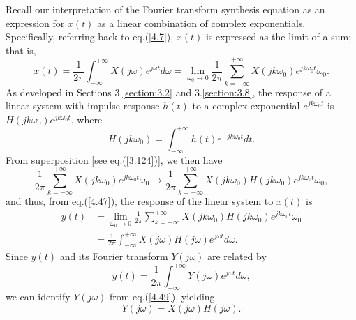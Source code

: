 \documentclass[a4paper,twoside]{book}
\begin{document}
Recall our interpretation of the Fourier transform synthesis equation as an expression for $x(t)$ as a linear combination of complex exponentials. Specifically, referring back to eq.\;(\ref{4.7}), $x(t)$ is expressed as the limit of a sum; that is,
\begin{equation}
    x(t)=\frac1{2\pi}\int_{-\infty}^{+\infty}X(j\omega)e^{j\omega t}d\omega=\lim_{\omega_0\to0}\frac1{2\pi}\sum_{k=-\infty}^{+\infty}X(jk\omega_0)e^{jk\omega_0t}\omega_0.
    \label{4.47}
\end{equation}
As developed in Sections 3.\ref{section:3.2} and 3.\ref{section:3.8}, the response of a linear system with impulse response $h(t)$ to a complex exponential $e^{jk\omega_0t}$ is $H(jk\omega_0)e^{jk\omega_0t}$, where
\begin{equation}
    H(jk\omega_0)=\int_{-\infty}^{+\infty}h(t)e^{-jk\omega_0t}dt.
    \label{4.48}
\end{equation}
From superposition [see eq.\;(\ref{3.124})], we then have $$\frac1{2\pi}\sum_{k=-\infty}^{+\infty}X(jk\omega_0)e^{jk\omega_0t}\omega_0\longrightarrow\frac1{2\pi}\sum_{k=-\infty}^{+\infty}X(jk\omega_0)H(jk\omega_0)e^{jk\omega_0t}\omega_0,$$ and thus, from eq.\;(\ref{4.47}), the response of the linear system to $x(t)$ is
\begin{equation}
    \begin{aligned}y(t)&=\lim_{\omega_0\to0}\frac1{2\pi}\sum_{k=-\infty}^{+\infty}X(jk\omega_0)H(jk\omega_0)e^{jk\omega_0t}\omega_0\\&=\frac1{2\pi}\int_{-\infty}^{+\infty}X(j\omega)H(j\omega)e^{j\omega t}d\omega.\end{aligned}
    \label{4.49}
\end{equation}
Since $y(t)$ and its Fourier transform $Y(j\omega)$ are related by
\begin{equation}
    y(t)=\frac1{2\pi}\int_{-\infty}^{+\infty}Y(j\omega)e^{j\omega t}d\omega,
    \label{4.50}
\end{equation}
we can identify $Y(j\omega)$ from eq.\;(\ref{4.49}), yielding
\begin{equation}
    Y(j\omega)=X(j\omega)H(j\omega).
    \label{4.51}
\end{equation}
\end{document}
